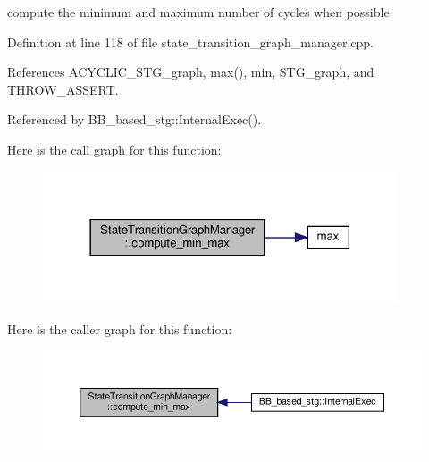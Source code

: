 compute the minimum and maximum number of cycles when possible 



Definition at line 118 of file state\+\_\+transition\+\_\+graph\+\_\+manager.\+cpp.



References A\+C\+Y\+C\+L\+I\+C\+\_\+\+S\+T\+G\+\_\+graph, max(), min, S\+T\+G\+\_\+graph, and T\+H\+R\+O\+W\+\_\+\+A\+S\+S\+E\+RT.



Referenced by B\+B\+\_\+based\+\_\+stg\+::\+Internal\+Exec().

Here is the call graph for this function\+:
\nopagebreak
\begin{figure}[H]
\begin{center}
\leavevmode
\includegraphics[width=297pt]{d9/dfd/classStateTransitionGraphManager_ac686261b6a110f27d563e3dbdd1cde57_cgraph}
\end{center}
\end{figure}
Here is the caller graph for this function\+:
\nopagebreak
\begin{figure}[H]
\begin{center}
\leavevmode
\includegraphics[width=350pt]{d9/dfd/classStateTransitionGraphManager_ac686261b6a110f27d563e3dbdd1cde57_icgraph}
\end{center}
\end{figure}
\mbox{\label{classStateTransitionGraphManager_a37495566ff3376074fbc09598e669ac3}} 
